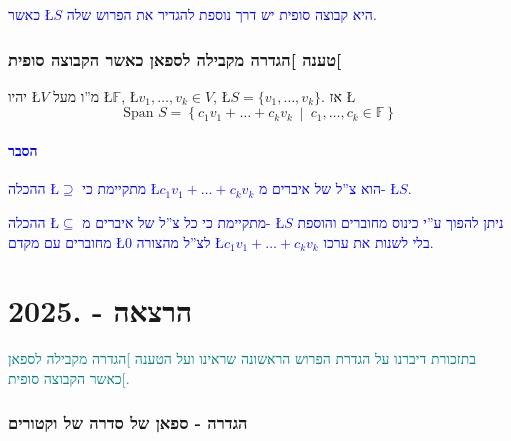 \documentclass[english,hebrew]{article}
\newcommand{\spn}{\text{Span }}
\begin{document}
\medskip{}

\textcolor{blue}{כאשר \L{$S$} היא קבוצה סופית יש דרך נוספת להגדיר
את הפרוש שלה.}

\section{טענה {]}הגדרה מקבילה לספאן כאשר הקבוצה סופית{[}}

יהיו \L{$V$} מ\textquotedblright ו מעל \L{$\mathbb{F}$}, \L{$v_{1},\dots,v_{k}\in V$},
\L{$S=\{v_{1},\dots,v_{k}\}$}. אז \L{%
\[
\spn S=\left\{ c_{1}v_{1}+\dots+c_{k}v_{k}\:\middle|\:c_{1},\dots,c_{k}\in\mathbb{F}\right\} 
\]
}%

\subsection{\textcolor{blue}{הסבר}}

\textcolor{blue}{ההכלה \L{$\supseteq$} מתקיימת כי \L{$c_{1}v_{1}+\dots+c_{k}v_{k}$}
הוא צ\textquotedblright ל של איברים מ- \L{$S$}.}

\textcolor{blue}{ההכלה \L{$\subseteq$} מתקיימת כי כל צ\textquotedblright ל
של איברים מ- \L{$S$} ניתן להפוך ע\textquotedblright י כינוס מחוברים
והוספת מחוברים עם מקדם \L{$0$} לצ\textquotedblright ל מהצורה \L{$c_{1}v_{1}+\dots+c_{k}v_{k}$}
בלי לשנות את ערכו.}

\newpage{}

\noindent{}

\part{הרצאה {\endL} - {.2025\endL}}

\textcolor{teal}{בתזכורת דיברנו על הגדרת הפרוש הראשונה שראינו ועל
הטענה {]}הגדרה מקבילה לספאן כאשר הקבוצה סופית{[}.}

\section{הגדרה - ספאן של סדרה של וקטורים}
\end{document}
